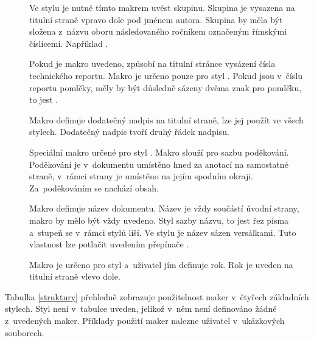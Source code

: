 \documentclass[12pt]{article}
\begin{document}
\begin{description}
\item[]
  Ve stylu  je nutné tímto makrem uvést skupinu. Skupina je
  vysazena na titulní straně vpravo dole pod jménem autora. Skupina by měla
  být složena z~názvu oboru následovaného ročníkem označeným římskými 
  číslicemi. Například .

\item[]
  Pokud je makro  uvedeno, způsobí na titulní stránce vysázení
  čísla technického reportu. Makro je určeno pouze pro styl .
  Pokud jsou v~číslu reportu pomlčky, měly by být důsledně sázeny dvěma znak
  pro pomlčku, to jest .

\item[]
  Makro  definuje dodatečný nadpis na titulní straně, lze jej
  použít ve všech stylech. Dodatečný nadpis tvoří druhý řádek nadpisu.

\item[]
  Speciální makro určené pro styl . Makro slouží pro sazbu 
  poděkování. Poděkování je v~dokumentu umístěno hned za anotací na samostatné
  straně, v~rámci strany je umístěno na jejím spodním okraji.
  Za~poděkováním se nachází obsah.

\item[]
  Makro definuje název dokumentu. Název je vždy součástí úvodní strany, makro
   by mělo být vždy uvedeno. 
  Styl sazby názvu, to jest řez písma a~stupeň se
  v~rámci stylů liší. Ve stylu  je název sázen versálkami.
  Tuto vlastnost lze potlačit uvedením přepínače .

\item[]
  Makro je určeno pro styl  a~uživatel jím definuje rok.
  Rok je uveden na titulní straně vlevo dole.

\end{description}

Tabulka \ref{struktury} přehledně zobrazuje použitelnost maker v~čtyřech
základních stylech. Styl  není v~tabulce uveden, jelikož v~něm
není definováno žádné z~uvedených maker. Příklady použití maker nalezne
uživatel v~ukázkových souborech.
\end{document}

